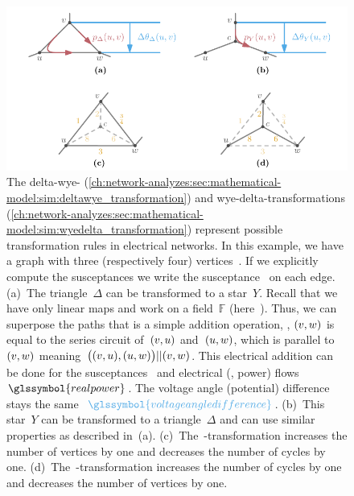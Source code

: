 % 
\begin{figure}[t!]
    \includegraphics{networkAnalyzes/figures/Delta-Wye-Transformation.pdf}
    \caption[The delta-wye- and wye-delta-transformations.]{The delta-wye-
    (\cref{ch:network-analyzes:sec:mathematical-model:sim:deltawye_transformation})
    and wye-delta-transformations
    (\cref{ch:network-analyzes:sec:mathematical-model:sim:wyedelta_transformation})
    represent possible transformation rules in electrical networks. In this
    example, we have a graph with three (respectively four)
    vertices~\tikzStandardVertex. If we explicitly compute the susceptances we
    write the \textcolor{SUSCEPTANCE}{susceptance~} on
    each edge. (a)~The triangle~$\Delta$ can be transformed to a star~$Y$.
    Recall that we have only linear maps and work on a field~$\mathbb F$
    (here~\reals). Thus, we can superpose the paths that is a simple addition
    operation, \eg, $ (v,w)$ is equal to the series circuit
    of~$(v,u)$ and~$(u,w)$, which is parallel
    to~$(v,w)$ meaning~$
        \big(
            (v,u),
            (u,w)
        \big)
        ||
        (v,w)
    $.
    This electrical addition can be done for the \textcolor{SUSCEPTANCE}
    {susceptances~} and \textcolor{KITred70}{electrical
    (\eg, power) flows~$\glssymbol{realpower}$}. The voltage angle (potential)
    difference stays the same~$
        \textcolor{THETA}{\glssymbol{voltageangledifference}}
    $. (b)~This star~$Y$ can be transformed to a triangle~$\Delta$ and can use
    similar properties as described in~\mbox{(a)}.
    (c)~The~\deltawye-transformation increases the number of vertices by one and
    decreases the number of cycles by one. (d)~The~\wyedelta-transformation
    increases the number of cycles by one and decreases the number of vertices
    by one.}
    \label{ch:network-analyzes:sec:mathematical-model:fig:DeltaWyeTransformation}
\end{figure}

